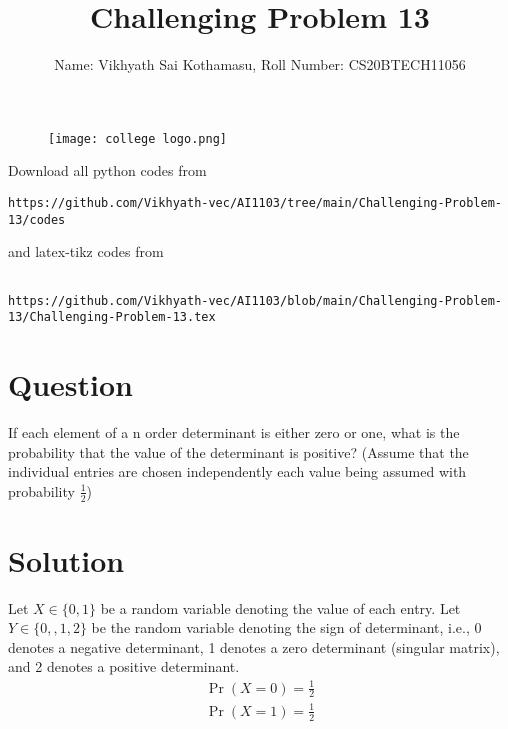 \documentclass[journal,12pt,twocolumn]{IEEEtran}
\begin{document}
\title{Challenging Problem 13}
\author{Name: Vikhyath Sai Kothamasu, Roll Number: CS20BTECH11056}
\maketitle
\newpage
\bigskip
\renewcommand{\thefigure}{\theenumi}
\renewcommand{\thetable}{\theenumi}

\begin{figure} [h]
    \texttt{[image: college logo.png]}
\end{figure}


%
Download all python codes from 
\begin{lstlisting}
https://github.com/Vikhyath-vec/AI1103/tree/main/Challenging-Problem-13/codes
\end{lstlisting}
%
and latex-tikz codes from 
%
\begin{lstlisting}

https://github.com/Vikhyath-vec/AI1103/blob/main/Challenging-Problem-13/Challenging-Problem-13.tex
\end{lstlisting}
\section*{Question}
If each element of a n order determinant is either zero or one, what is the probability that the value of the determinant is positive? (Assume that the individual entries are chosen independently each value being assumed with probability $\frac{1}{2}$)
    
\section*{Solution}
Let $X \in \{0,1\}$ be a random variable denoting the value of each entry. Let $Y \in \{0, ,1, 2\}$ be the random variable denoting the sign of determinant, i.e., 0 denotes a negative determinant, 1 denotes a zero determinant (singular matrix), and 2 denotes a positive determinant.
\begin{align}
    \Pr{(X=0)} = \frac{1}{2}
    \\ \Pr{(X=1)} = \frac{1}{2}
\end{align}
\end{document}
